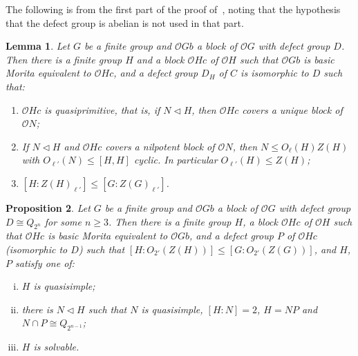 \documentclass{amsart}
\theoremstyle{plain}\newtheorem{Theorem}{Theorem}[section]
\theoremstyle{plain}\newtheorem{Conjecture}[Theorem]{Conjecture}
\theoremstyle{plain}\newtheorem{Corollary}[Theorem]{Corollary}
\theoremstyle{plain}\newtheorem{Lemma}[Theorem]{Lemma}
\theoremstyle{plain}\newtheorem{Proposition}[Theorem]{Proposition}
\theoremstyle{definition}\newtheorem{Definition}[Theorem]{Definition}
\theoremstyle{definition}\newtheorem{Example}[Theorem]{Example}
\theoremstyle{definition}\newtheorem{Examples}[Theorem]{Examples}
\theoremstyle{definition}\newtheorem{Exercise}[Theorem]{Exercise}
\theoremstyle{definition}\newtheorem{Notation}[Theorem]{Notation}
\theoremstyle{definition}\newtheorem{Remark}[Theorem]{Remark}
\theoremstyle{definition}\newtheorem{Remarks}[Theorem]{Remarks}
\def\CO{{\mathcal{O}}}    \def\OPE{{\mathcal{O}(P\rtimes E)}}
\numberwithin{equation}{section}
\begin{document}
The following is from the first part of the proof of~\cite[Prop.~4.3]{eel20}, noting that the hypothesis that the defect group is abelian is not used in that part.

\begin{Lemma}
Let $G$ be a finite group and $\CO Gb$ a block of $\CO G$ with defect group $D$. Then there is a finite group $H$ and a block $\CO Hc$ of $\CO H$ such that $\CO Gb$ is basic Morita equivalent to $\CO Hc$, and a defect group $D_H$ of $C$ is isomorphic to $D$ such that:
\begin{enumerate} 
\item[(R1)] $\CO Hc$ is quasiprimitive, that is, if $N \lhd H$, then $\CO Hc$ covers a unique block of $\CO N$;
\item[(R2)] If $N \lhd H$ and $\CO Hc$ covers a nilpotent block of $\CO N$, then $N \leq O_\ell(H)Z(H)$ with $O_{\ell'}(N) \leq [H,H]$ cyclic. In particular $O_{\ell'}(H) \leq Z(H)$;
\item[(R3)] $[H:Z(H)_{\ell'}]\leq  [G:Z(G)_{\ell'}]$.
\end{enumerate}
\end{Lemma}

\begin{Proposition}   
Let $G$ be a finite group and $\CO Gb$ a block of $\CO G$ with defect group $D \cong Q_{2^n}$ for some $n \geq 3$. Then there is a finite group $H$, a block $\CO Hc$ of $\CO H$ such that $\CO Hc$ is basic Morita equivalent to $\CO Gb$, and a defect group $P$ of $\CO Hc$ (isomorphic to $D$) such that $[H:O_{2'}(Z(H))] \leq [G:O_{2'}(Z(G))]$, and $H$, $P$ satisfy one of:
\begin{enumerate}[(i)]
\item $H$ is quasisimple;
\item there is $N \lhd H$ such that $N$ is quasisimple, $[H:N]=2$, $H=NP$ and $N \cap P \cong Q_{2^{n-1}}$;
\item $H$ is solvable.
    
\end{enumerate}
\end{Proposition}
\end{document}
